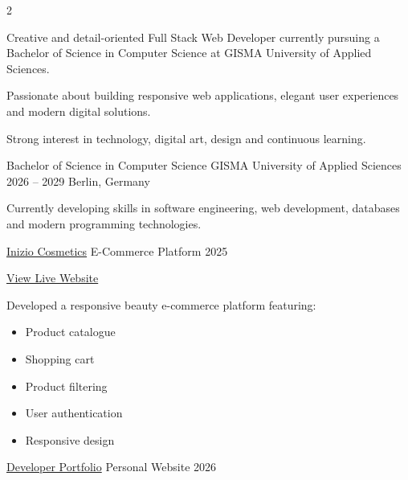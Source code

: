 \documentclass[10pt,a4paper,withhyper]{altacv}
\begin{document}



\makecvheader


\begin{paracol}{2}


Creative and detail-oriented Full Stack Web Developer currently pursuing a Bachelor of Science in Computer Science at GISMA University of Applied Sciences.

Passionate about building responsive web applications, elegant user experiences and modern digital solutions.

Strong interest in technology, digital art, design and continuous learning.


\cvevent
{Bachelor of Science in Computer Science}
{GISMA University of Applied Sciences}
{2026 -- 2029}
{Berlin, Germany}

Currently developing skills in software engineering, web development, databases and modern programming technologies.

\divider


\cvevent
{\href{https://kimberly-makeup.vercel.app/}{Inizio Cosmetics}}
{E-Commerce Platform}
{2025}
{}

\href{https://kimberly-makeup.vercel.app/}{View Live Website}



Developed a responsive beauty e-commerce platform featuring:

\begin{itemize}
\item Product catalogue
\item Shopping cart
\item Product filtering
\item User authentication
\item Responsive design
\end{itemize}

\divider

\cvevent
{\href{https://your-portfolio-link.com}{Developer Portfolio}}
{Personal Website}
{2026}
{}


\end{paracol}
\end{document}
